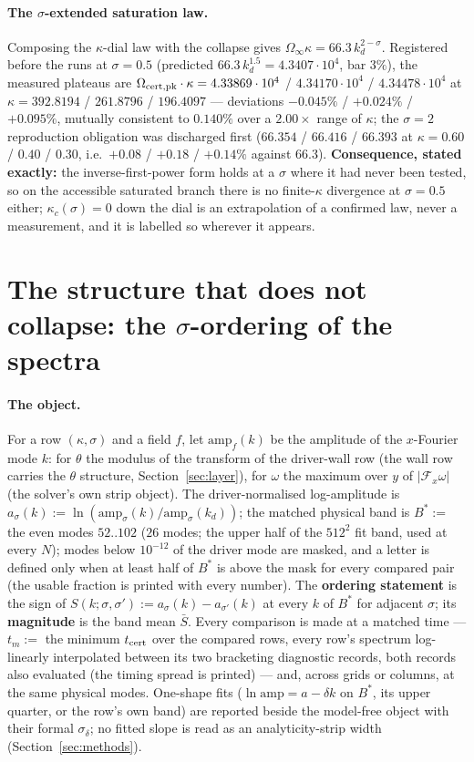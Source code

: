 \documentclass[11pt,a4paper]{article}
\newcommand{\abs}[1]{\lvert #1 \rvert}
\newcommand{\kd}{k_d}
\newcommand{\Om}{\Omega_{\rm cert,pk}}
\newcommand{\tcert}{t_{\rm cert}}
\newcommand{\tm}{t_m}
\newcommand{\Bst}{B^*}
\newcommand{\Sbar}{\bar S}
\begin{document}
\paragraph{The $\sigma$-extended saturation law.} Composing the $\kappa$-dial law with the collapse gives $\Omega_\infty\kappa=66.3\,\kd^{2-\sigma}$. Registered before the runs at $\sigma=0.5$ (predicted $66.3\,\kd^{1.5}=4.3407\cdot10^4$, bar $3\%$), the measured plateaus are $\Om\cdot\kappa=4.33869\cdot10^4$ / $4.34170\cdot10^4$ / $4.34478\cdot10^4$ at $\kappa=392.8194$ / $261.8796$ / $196.4097$ --- deviations $-0.045\%$ / $+0.024\%$ / $+0.095\%$, mutually consistent to $0.140\%$ over a $2.00\times$ range of $\kappa$; the $\sigma=2$ reproduction obligation was discharged first ($66.354$ / $66.416$ / $66.393$ at $\kappa=0.60$ / $0.40$ / $0.30$, i.e.\ $+0.08$ / $+0.18$ / $+0.14\%$ against $66.3$). \textbf{Consequence, stated exactly:} the inverse-first-power form holds at a $\sigma$ where it had never been tested, so on the accessible saturated branch there is no finite-$\kappa$ divergence at $\sigma=0.5$ either; $\kappa_c(\sigma)=0$ down the dial is an extrapolation of a confirmed law, never a measurement, and it is labelled so wherever it appears.

\section{The structure that does not collapse: the \texorpdfstring{$\sigma$}{sigma}-ordering of the spectra}\label{sec:ordering}

\paragraph{The object.} For a row $(\kappa,\sigma)$ and a field $f$, let $\mathrm{amp}_f(k)$ be the amplitude of the $x$-Fourier mode $k$: for $\theta$ the modulus of the transform of the driver-wall row (the wall row carries the $\theta$ structure, Section~\ref{sec:layer}), for $\omega$ the maximum over $y$ of $\abs{\mathcal F_x\omega}$ (the solver's own strip object). The driver-normalised log-amplitude is $a_\sigma(k):=\ln(\mathrm{amp}_\sigma(k)/\mathrm{amp}_\sigma(\kd))$; the matched physical band is $\Bst:=$ the even modes $52..102$ ($26$ modes; the upper half of the $512^2$ fit band, used at every $N$); modes below $10^{-12}$ of the driver mode are masked, and a letter is defined only when at least half of $\Bst$ is above the mask for every compared pair (the usable fraction is printed with every number). The \textbf{ordering statement} is the sign of $S(k;\sigma,\sigma'):=a_\sigma(k)-a_{\sigma'}(k)$ at every $k$ of $\Bst$ for adjacent $\sigma$; its \textbf{magnitude} is the band mean $\Sbar$. Every comparison is made at a matched time --- $\tm:=$ the minimum $\tcert$ over the compared rows, every row's spectrum log-linearly interpolated between its two bracketing diagnostic records, both records also evaluated (the timing spread is printed) --- and, across grids or columns, at the same physical modes. One-shape fits ($\ln\mathrm{amp}=a-\delta k$ on $\Bst$, its upper quarter, or the row's own band) are reported beside the model-free object with their formal $\sigma_\delta$; no fitted slope is read as an analyticity-strip width (Section~\ref{sec:methods}).
\end{document}
